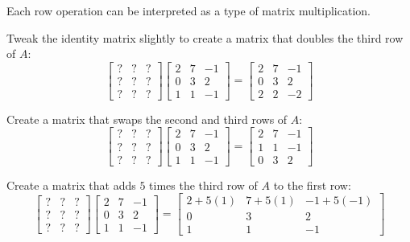 \begin{applicationActivities}
\begin{activity}{20}
Each row operation can be interpreted as a type of matrix multiplication.
\begin{subactivity}
Tweak the identity matrix slightly to create a matrix that
doubles the third row of $A$:
\[
 \begin{bmatrix} ? & ? & ? \\ ? & ? & ? \\ ? & ? & ? \end{bmatrix}
 \begin{bmatrix} 2 & 7 & -1 \\ 0 & 3 & 2 \\ 1 & 1 & -1 \end{bmatrix}
=
 \begin{bmatrix} 2 & 7 & -1 \\ 0 & 3 & 2 \\ 2 & 2 & -2 \end{bmatrix}
\]
\end{subactivity}
\begin{subactivity}
  Create a matrix that swaps the second and third rows of $A$:
  \[
   \begin{bmatrix} ? & ? & ? \\ ? & ? & ? \\ ? & ? & ? \end{bmatrix}
   \begin{bmatrix} 2 & 7 & -1 \\ 0 & 3 & 2 \\ 1 & 1 & -1 \end{bmatrix}
  =
  \begin{bmatrix} 2 & 7 & -1 \\ 1 & 1 & -1 \\ 0 & 3 & 2 \end{bmatrix}
  \]
\end{subactivity}
\begin{subactivity}
Create a matrix that adds $5$ times the third row of $A$ to the first row:
\[
 \begin{bmatrix} ? & ? & ? \\ ? & ? & ? \\ ? & ? & ? \end{bmatrix}
 \begin{bmatrix} 2 & 7 & -1 \\ 0 & 3 & 2 \\ 1 & 1 & -1 \end{bmatrix}
=
 \begin{bmatrix} 2+5(1) & 7+5(1) & -1+5(-1) \\ 0 & 3 & 2 \\ 1 & 1 & -1 \end{bmatrix}
\]
\end{subactivity}
\end{activity}


\end{applicationActivities}
